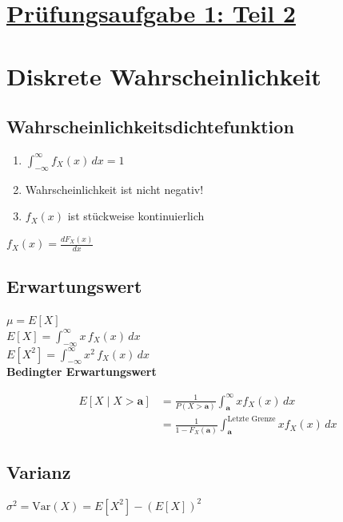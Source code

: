 \documentclass[12pt]{article}
\begin{document}
\begin{minipage}[t]{0.45\textwidth}
   \end{minipage}
   
   
\newpage

\section*{\underline{Prüfungsaufgabe 1: Teil 2}}

\pagecolor{Aufgabe1Teil2}

\noindent
\begin{minipage}[t]{0.45\textwidth}

\section*{Diskrete Wahrscheinlichkeit}

   \subsection*{Wahrscheinlichkeitsdichtefunktion}

   \begin{enumerate}
      \item \(\int_{-\infty}^{\infty} f_X(x) \, dx = 1\)
      \item Wahrscheinlichkeit ist nicht negativ!
      \item \(f_X(x)\) ist stückweise kontinuierlich
   \end{enumerate}

   \(f_X(x) = \frac{dF_X(x)}{dx}\)

   \subsection*{Erwartungswert}

      \(\mu = E[X]\)\\[10pt]
      \(E[X] = \int_{-\infty}^{\infty} x \, f_X(x) \, dx\)  \\[10pt]
      \(E[X^2] = \int_{-\infty}^{\infty} x^2 \, f_X(x) \, dx\) \\[5pt]

      \textbf{Bedingter Erwartungswert}

      \begin{align*}
         E[X \mid X > \mathbf{a}]    &= \frac{1}{P(X > \mathbf{a})} \int_{\mathbf{a}}^{\infty} x f_X(x) \, dx \\[5pt]
         &= \frac{1}{1 - F_X(\mathbf{a})} \int_{\mathbf{a}}^{\text{Letzte Grenze}} x f_X(x) \, dx
      \end{align*}

   \subsection*{Varianz}

      \(\sigma^2 = \text{Var}(X) = E[X^2] - (E[X])^2\)  %

   \end{minipage}
\end{document}
